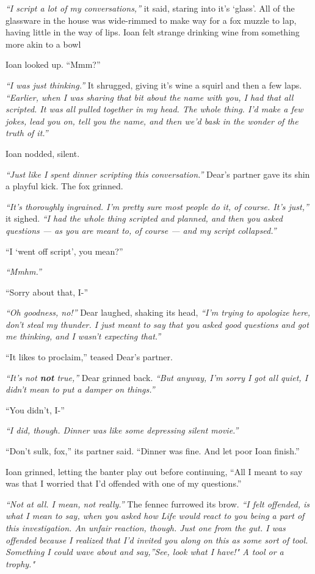 \emph{``I script a lot of my conversations,''} it said, staring into it's `glass'. All of the glassware in the house was wide-rimmed to make way for a fox muzzle to lap, having little in the way of lips. Ioan felt strange drinking wine from something more akin to a bowl

Ioan looked up. ``Mmm?''

\emph{``I was just thinking.''} It shrugged, giving it's wine a squirl and then a few laps. \emph{``Earlier, when I was sharing that bit about the name with you, I had that all scripted. It was all pulled together in my head. The whole thing. I'd make a few jokes, lead you on, tell you the name, and then we'd bask in the wonder of the truth of it.''}

Ioan nodded, silent.

\emph{``Just like I spent dinner scripting this conversation.''} Dear's partner gave its shin a playful kick. The fox grinned.

\emph{``It's thoroughly ingrained. I'm pretty sure most people do it, of course. It's just,''} it sighed. \emph{``I had the whole thing scripted and planned, and then you asked questions — as you are meant to, of course — and my script collapsed.''}

``I `went off script', you mean?''

\emph{``Mmhm.''}

``Sorry about that, I-''

\emph{``Oh goodness, no!''} Dear laughed, shaking its head, \emph{``I'm trying to apologize here, don't steal my thunder. I just meant to say that you asked good questions and got me thinking, and I wasn't expecting that.''}

``It likes to proclaim,'' teased Dear's partner.

\emph{``It's not \textbf{not} true,''} Dear grinned back. \emph{``But anyway, I'm sorry I got all quiet, I didn't mean to put a damper on things.''}

``You didn't, I-''

\emph{``I did, though. Dinner was like some depressing silent movie.''}

``Don't sulk, fox,'' its partner said. ``Dinner was fine. And let poor Ioan finish.''

Ioan grinned, letting the banter play out before continuing, ``All I meant to say was that I worried that I'd offended with one of my questions.''

\emph{``Not at all. I mean, not really.''} The fennec furrowed its brow. \emph{``I felt offended, is what I mean to say, when you asked how Life would react to you being a part of this investigation. An unfair reaction, though. Just one from the gut. I was offended because I realized that I'd invited you along on this as some sort of tool. Something I could wave about and say,''See, look what I have!" A tool or a trophy."}

